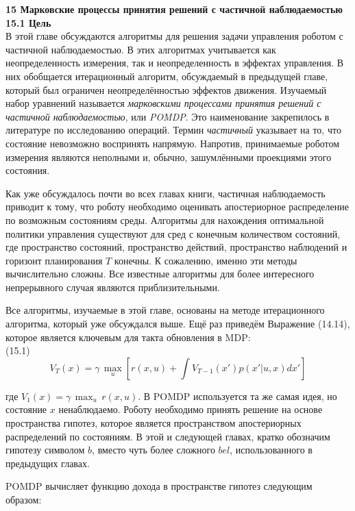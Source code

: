 \documentclass[10pt,a4paper]{article}
\begin{document}
\textbf{15 Марковские процессы принятия решений с частичной наблюдаемостью}\\

\textbf{15.1	Цель}\\

В этой главе обсуждаются алгоритмы для решения задачи управления роботом с частичной наблюдаемостью. В этих алгоритмах учитывается как неопределенность измерения, так и неопределенность в эффектах управления. В них обобщается итерационный алгоритм, обсуждаемый в предыдущей главе, который был ограничен неопределённостью эффектов движения. Изучаемый набор уравнений называется \textit{марковскими процессами принятия решений с частичной наблюдаемостью}, или \textit{POMDP}. Это наименование закрепилось в литературе по исследованию операций. Термин \textit{частичный} указывает на то, что состояние невозможно воспринять напрямую. Напротив, принимаемые роботом измерения являются неполными и, обычно, зашумлёнными проекциями этого состояния.

Как уже обсуждалось почти во всех главах книги, частичная наблюдаемость приводит к тому, что роботу необходимо оценивать апостериорное распределение по возможным состояниям среды. Алгоритмы для нахождения оптимальной политики управления существуют для сред с конечным количеством состояний, где пространство состояний, пространство действий, пространство наблюдений и горизонт планирования $T$ конечны. К сожалению, именно эти методы вычислительно сложны. Все известные алгоритмы для более интересного непрерывного случая являются приблизительными.

Все алгоритмы, изучаемые в этой главе, основаны на методе итерационного алгоритма, который уже обсуждался выше. Ещё раз приведём Выражение (14.14), которое является ключевым для такта обновления в MDP:\\

(15.1)
$$V_T(x)=\gamma\,\underset{u}{\max}[r(x,u)+\int V_{T-1}(x')p(x'|u,x)dx']$$

где $V_1(x) = \gamma \,\max_u\,r(x,u)$. В POMDP используется та же самая идея, но состояние $x$ ненаблюдаемо. Роботу необходимо принять решение на основе пространства гипотез, которое является пространством апостериорных распределений по состояниям. В этой и следующей главах, кратко обозначим гипотезу символом $b$, вместо чуть более сложного $bel$, использованного в предыдущих главах.

POMDP вычисляет функцию дохода в пространстве гипотез следующим образом:\\
\end{document}
